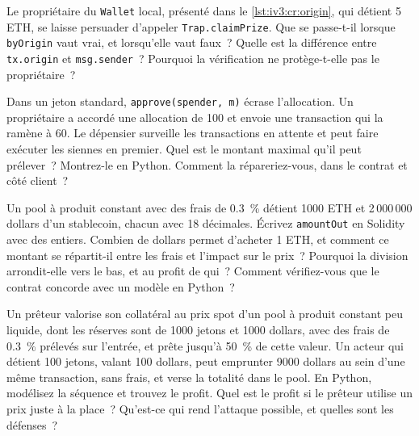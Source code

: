 \begin{question}\label{iq:iv3:smart-contracts-and-crypto-engineering:12}
Le propriétaire du \texttt{Wallet} local, présenté dans le \cref{lst:iv3:cr:origin}, qui détient 5 ETH, se laisse persuader d'appeler \texttt{Trap.claimPrize}. Que se passe-t-il lorsque \texttt{byOrigin} vaut vrai, et lorsqu'elle vaut faux~? Quelle est la différence entre \texttt{tx.origin} et \texttt{msg.sender}~? Pourquoi la vérification ne protège-t-elle pas le propriétaire~?
\label{lst:iv3:cr:origin}
\end{question}

\begin{question}\label{iq:iv3:smart-contracts-and-crypto-engineering:13}
Dans un jeton standard, \texttt{approve(spender, m)} écrase l'allocation. Un propriétaire a accordé une allocation de 100 et envoie une transaction qui la ramène à 60. Le dépensier surveille les transactions en attente et peut faire exécuter les siennes en premier. Quel est le montant maximal qu'il peut prélever~? Montrez-le en Python. Comment la répareriez-vous, dans le contrat et côté client~?
\end{question}

\begin{question}\label{iq:iv3:smart-contracts-and-crypto-engineering:14}
Un pool à produit constant avec des frais de 0.3~\% détient 1000 ETH et 2\,000\,000 dollars d'un stablecoin, chacun avec 18 décimales. Écrivez \texttt{amountOut} en Solidity avec des entiers. Combien de dollars permet d'acheter 1 ETH, et comment ce montant se répartit-il entre les frais et l'impact sur le prix~? Pourquoi la division arrondit-elle vers le bas, et au profit de qui~? Comment vérifiez-vous que le contrat concorde avec un modèle en Python~?
\end{question}

\begin{question}\label{iq:iv3:smart-contracts-and-crypto-engineering:15}
Un prêteur valorise son collatéral au prix spot d'un pool à produit constant peu liquide, dont les réserves sont de 1000 jetons et 1000 dollars, avec des frais de 0.3~\% prélevés sur l'entrée, et prête jusqu'à 50~\% de cette valeur. Un acteur qui détient 100 jetons, valant 100 dollars, peut emprunter 9000 dollars au sein d'une même transaction, sans frais, et verse la totalité dans le pool. En Python, modélisez la séquence et trouvez le profit. Quel est le profit si le prêteur utilise un prix juste à la place~? Qu'est-ce qui rend l'attaque possible, et quelles sont les défenses~?
\end{question}

